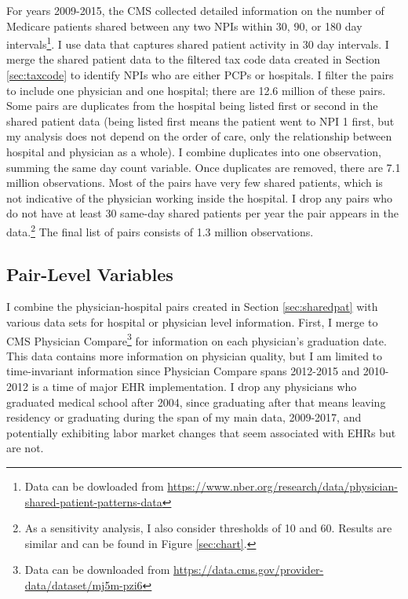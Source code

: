 \documentclass[12pt]{article}
\begin{document}
For years 2009-2015, the CMS collected detailed information on the number of Medicare patients shared between any two NPIs within 30, 90, or 180 day intervals\footnote{Data can be dowloaded from \hyperlink{https://www.nber.org/research/data/physician-shared-patient-patterns-data}{https://www.nber.org/research/data/physician-shared-patient-patterns-data}}. I use data that captures shared patient activity in 30 day intervals. I merge the shared patient data to the filtered tax code data created in Section \ref{sec:taxcode} to identify NPIs who are either PCPs or hospitals. I filter the pairs to include one physician and one hospital; there are 12.6 million of these pairs. Some pairs are duplicates from the hospital being listed first or second in the shared patient data (being listed first means the patient went to NPI 1 first, but my analysis does not depend on the order of care, only the relationship between hospital and physician as a whole). I combine duplicates into one observation, summing the same day count variable. Once duplicates are removed, there are 7.1 million observations. Most of the pairs have very few shared patients, which is not indicative of the physician working inside the hospital. I drop any pairs who do not have at least 30 same-day shared patients per year the pair appears in the data.\footnote{As a sensitivity analysis, I also consider thresholds of 10 and 60. Results are similar and can be found in Figure \ref{sec:chart}.} The final list of pairs consists of 1.3 million observations. 

\subsection{Pair-Level Variables}

I combine the physician-hospital pairs created in Section \ref{sec:sharedpat} with various data sets for hospital or physician level information. First, I merge to CMS Physician Compare\footnote{Data can be downloaded from \hyperlink{https://data.cms.gov/provider-data/dataset/mj5m-pzi6}{https://data.cms.gov/provider-data/dataset/mj5m-pzi6}} for information on each physician's graduation date. This data contains more information on physician quality, but I am limited to time-invariant information since Physician Compare spans 2012-2015 and 2010-2012 is a time of major EHR implementation. I drop any physicians who graduated medical school after 2004, since graduating after that means leaving residency or graduating during the span of my main data, 2009-2017, and potentially exhibiting labor market changes that seem associated with EHRs but are not. 
\end{document}
